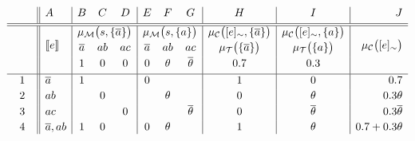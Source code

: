 \documentclass{article}
\begin{document}
\begin{equation*}
	\begin{array}{c||l|ccc|ccc|c|c|r}
		  &
		A & B                                         & C      & D           & E & F & G & H & I & J
		\\[3pt]
		\hline
		\hline
		\multirow{3}{*}{\phantom{2em}}
		  & \multirow{3}{*}{\stablecore{e}}
		  & \multicolumn{3}{c|}{\pwm{s,\set{\co{a}}}}
		  & \multicolumn{3}{c|}{\pwm{s,\set{a}}}
		  & \pwc{\class{e},\set{\co{a}}}
		  & \pwc{\class{e},\set{a}}
		  & \multirow{3}{*}{\pwc{\class{e}}}
		\\[2pt]
		  &
		  & \co{a}                                    & ab     & ac
		  & \co{a}                                    & ab     & ac
		  & \pwt{\set{\co{a}}}
		  & \pwt{\set{a}}
		  &
		\\[2pt]
		  &
		  & 1                                         & 0      & 0
		  & 0                                         & \theta & \co{\theta}
		  & 0.7
		  & 0.3
		  &
		\\[3pt]
		\hline
		1
		  & \co{a}
		  & 1                                         &        &
		  & 0                                         &        &
		  & 1
		  & 0
		  & 0.7
		\\[2pt]
		2
		  & ab
		  &                                           & 0      &
		  &                                           & \theta &
		  & 0
		  & \theta
		  & 0.3\theta
		\\[2pt]
		3
		  & ac
		  &                                           &        & 0
		  &                                           &        & \co{\theta}
		  & 0
		  & \co{\theta}
		  & 0.3\co{\theta}
		\\[2pt]
		4
		  & \co{a}, ab
		  & 1                                         & 0      &
		  & 0                                         & \theta &
		  & 1
		  & \theta
		  & 0.7 + 0.3\theta

\end{array}
\end{equation*}
\end{document}
